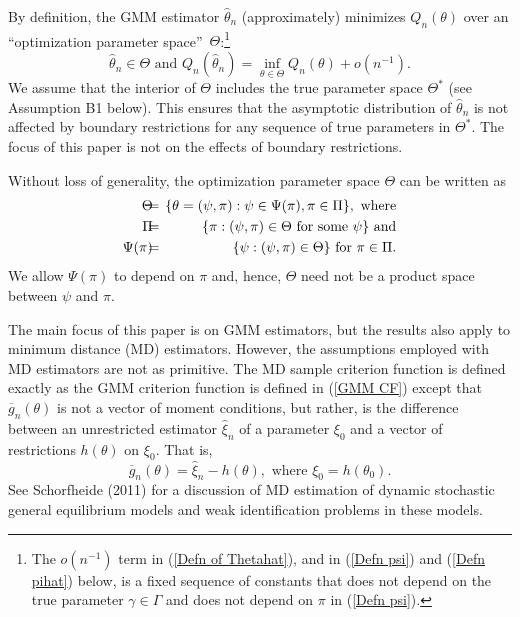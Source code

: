 \documentclass[12pt,thmsb,titlepage,final,oneside,letterpaper]{article}
\begin{document}
By definition, the GMM estimator $\widehat{\theta }_{n}$ (approximately)
minimizes $Q_{n}(\theta )$ over an \textquotedblleft optimization parameter
space\textquotedblright\ $\Theta $:\footnote{%
The $o(n^{-1})$ term in (\ref{Defn of Thetahat}), and in (\ref{Defn psi})
and (\ref{Defn pihat}) below, is a fixed sequence of constants that does not
depend on the true parameter $\gamma \in \Gamma $ and does not depend on $%
\pi $ in (\ref{Defn psi}).}%
\begin{equation}
\widehat{\theta }_{n}\in \Theta \text{ and }Q_{n}(\widehat{\theta }%
_{n})=\inf_{\theta \in \Theta }Q_{n}(\theta )+o(n^{-1}).
\label{Defn of Thetahat}
\end{equation}%
We assume that the interior of $\Theta $ includes the true parameter space $%
\Theta ^{\ast }$ (see Assumption B1 below). This ensures that the asymptotic
distribution of $\widehat{\theta }_{n}$ is not affected by boundary
restrictions for any sequence of true parameters in $\Theta ^{\ast }.$ The
focus of this paper is not on the effects of boundary restrictions.

Without loss of generality, the optimization parameter space $\Theta $ can
be written as%
\begin{eqnarray}
\Theta \hspace{-0.08in} &=&\hspace{-0.08in}\{\theta =(\psi ,\pi ):\psi \in
\Psi (\pi ),\pi \in \Pi \},\text{ where}  \notag \\
\Pi \hspace{-0.08in} &=&\hspace{-0.08in}\{\pi :(\psi ,\pi )\in \Theta \text{
for some }\psi \}\text{ and}  \notag \\
\Psi (\pi )\hspace{-0.08in} &=&\hspace{-0.08in}\{\psi :(\psi ,\pi )\in
\Theta \}\text{ for }\pi \in \Pi .  \label{Defn of Par Sp Pi and Psi}
\end{eqnarray}%
We allow $\Psi (\pi )$ to depend on $\pi $ and, hence, $\Theta $ need not be
a product space between $\psi $ and $\pi .$

The main focus of this paper is on GMM estimators, but the results also
apply to minimum distance (MD) estimators. However, the assumptions employed
with MD estimators are not as primitive. The MD sample criterion function is
defined exactly as the GMM criterion function is defined in (\ref{GMM CF})
except that $\overline{g}_{n}(\theta )$ is not a vector of moment
conditions, but rather, is the difference between an unrestricted estimator $%
\widehat{\xi }_{n}$ of a parameter $\xi _{0}$ and a vector of restrictions $%
h(\theta )$ on $\xi _{0}.$ That is, 
\begin{equation}
\overline{g}_{n}(\theta )=\widehat{\xi }_{n}-h(\theta ),\text{ where }\xi
_{0}=h(\theta _{0}).  \label{MD defn}
\end{equation}%
See Schorfheide (2011) for a discussion of MD estimation of dynamic
stochastic general equilibrium models and weak identification problems in
these models.
\end{document}
